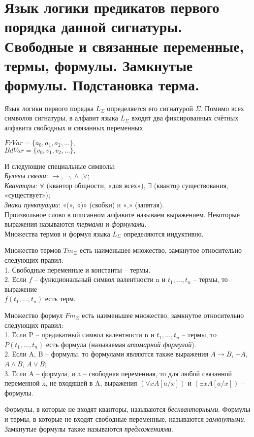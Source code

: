 \section{Язык логики предикатов первого порядка данной сигнатуры. Свободные
и связанные переменные, термы, формулы. Замкнутые формулы. Подстановка терма.}

\begin{definition}
	Язык логики первого порядка $L_{\Sigma }$ определяется его сигнатурой $\varSigma $. Помимо всех
	символов сигнатуры, в алфавит языка $L_{\Sigma}$ входят два фиксированных счётных
	алфавита свободных и связанных переменных

	\begin{center}
		$ FrVar = \{a_{0}, a_{1}, a_{2}, \ldots \},$ \\
		$ BdVar = \{v_{0}, v_{1},v_{2}, \ldots \},  \label{formula4}  $

	\end{center}
	И следующие специальные символы:\\
	\textit{Булевы связки}: $\rightarrow$, $\neg$, $\wedge$ ,$ \vee $;\\
	\textit{Кванторы}: $\forall$ (квантор общности, «для всех»), $\exists$ (квантор существования, «существует»);\\
	\textit{Знаки пунктуации}: «(», «)» (скобки) и «,» (запятая).\\
	Произвольное слово в описанном алфавите называем выражением. Некоторые выражения называются \textit{термами} и
	\textit{формулами}.\\
	Множества термов и формул языка $L_{\Sigma }$ определяются индуктивно.
\end{definition}

\begin{definition}
	Множество термов $Tm_{\Sigma }$ есть наименьшее множество, замкнутое относительно следующих правил:\\
	1. Свободные переменные и константы -- термы.\\
	2. Если $f$ -- функциональный символ валентности n и $t_{1}, \ldots ,t_{n}  $ -- термы,
	то выражение \\$f(t_{1}, \ldots , t_{n})$ есть терм.
\end{definition}


\begin{definition}
	Множество формул $Fm_{\Sigma}$ есть наименьшее множество,
	замкнутое относительно следующих правил:\\
	1. Если P -- предикатный символ валентности n и $t_{1}, \ldots,t_{n}$ -- термы,
	то $P(t_{1}, \ldots , t_{n})$ есть формула (называемая \textit{атомарной формулой}).\\
	2. Если A, B -- формулы, то формулами являются также выражения $A\rightarrow B$, $\neg A$, $A\wedge B$, $ A\vee B $; \\
	3. Если A -- формула, и a -- свободная переменная, то для любой связанной
	переменной x, не входящей в A, выражения $(\forall x A[a/x])$ и $(\exists x A[a/x]) $ -- формулы. 
\end{definition}

Формулы, в которые не входят кванторы, называются \textit{бескванторными}. Формулы и термы, в которые не входят
свободные переменные, называются \textit{замкнутыми}. Замкнутые формулы также называются \textit{предложениями}.


